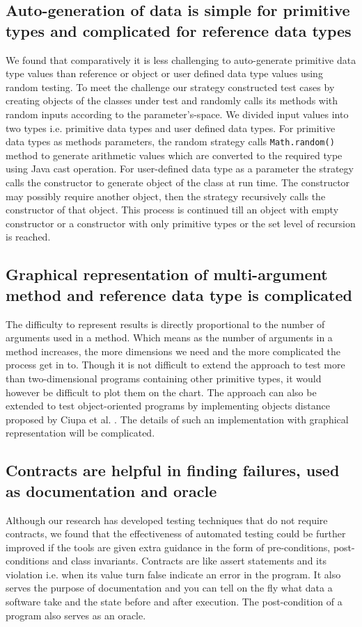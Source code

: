 \subsection{Auto-generation of data is simple for primitive types and complicated for reference data types}
We found that comparatively it is less challenging to auto-generate primitive data type values than reference or object or user defined data type values using random testing. To meet the challenge our strategy constructed test cases by creating objects of the classes under test and randomly calls its methods with random inputs according to the parameter's-space. We divided input values into two types i.e. primitive data types and user defined data types. For primitive data types as methods parameters, the random strategy calls \verb+Math.random()+ method to generate arithmetic values which are converted to the required type using Java cast operation. For user-defined data type as a parameter the strategy calls the constructor to generate object of the class at run time. The constructor may possibly require another object, then the strategy recursively calls the constructor of that object. This process is continued till an object with empty constructor or a constructor with only primitive types or the set level of recursion is reached.


\subsection{Graphical representation of multi-argument method and reference data type is complicated}
The difficulty to represent results is directly proportional to the number of arguments used in a method. Which means as the number of arguments in a method increases, the more dimensions we need and the more complicated the process get in to. Though it is not difficult to extend the approach to test more than two-dimensional programs containing other primitive types, it would however be difficult to plot them on the chart. The approach can also be extended to test object-oriented programs by implementing objects distance proposed by Ciupa et al. \cite{ciupa2006object}. The details of such an implementation with graphical representation will be complicated.


\subsection{Contracts are helpful in finding failures, used as documentation and oracle}
Although our research has developed testing techniques that do not require contracts, we found that the effectiveness of automated testing could be further improved if the tools are given extra guidance in the form of pre-conditions, post-conditions and class invariants. Contracts are like assert statements and its violation i.e. when its value turn false indicate an error in the program. It also serves the purpose of documentation and you can tell on the fly what data a software take and the state before and after execution. The post-condition of a program also serves as an oracle.







